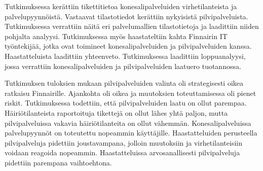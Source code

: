 Tutkimuksessa kerättiin tikettitietoa konesalipalveluiden virhetilanteista ja palvelupyynnöistä. Vastaavat tilastotiedot kerättiin nykyisistä pilvipalveluista. Tutkimuksessa verrattiin näitä eri palvelumallien tilastotietoja ja laadittiin niiden pohjalta analyysi. Tutkimuksessa myös haastateltiin kahta Finnairin IT työntekijää, jotka ovat toimineet konesalipalveluiden ja pilvipalveluiden kanssa. Haastatteluista laadittiin yhteenveto. Tutkimuksessa laadittiin loppuanalyysi, jossa verrattiin konesalipalveluiden ja pilvipalveluiden laatuero tuotannossa.

Tutkimuksen tuloksien mukaan pilvipalveluiden valinta oli strategisesti oikea ratkaisu Finnairille. Ajankohta oli oikea ja muutoksien toteuttamisessa oli pienet riskit. Tutkimuksessa todettiin, että pilvipalveluiden laatu on ollut parempaa. Häiriötilanteista raportoituja tikettejä on ollut lähes yhtä paljon, mutta pilvipalveluissa vakavia häiriötilanteita on ollut vähemmän. Konesalipalveluissa palvelupyynnöt on toteutettu nopeammin käyttäjille. Haastatteluiden perusteella pilvipalveluja pidettiin joustavampana, jolloin muutoksiin ja virhetilanteisiin voidaan reagoida nopeammin. Haastatteluissa arvosanallisesti pilvipalveluja pidettiin parempana vaihtoehtona.
